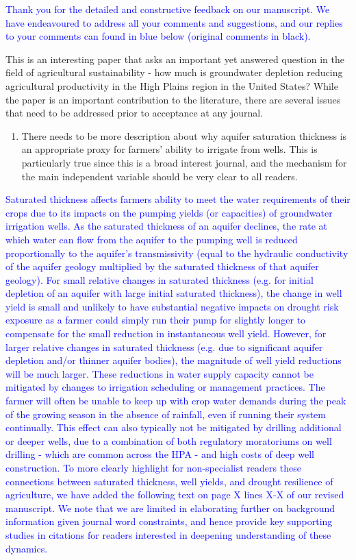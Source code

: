 \documentclass[
]{article}
\author{}
\date{\vspace{-2.5em}}
\providecommand{\tightlist}{%
  \setlength{\itemsep}{0pt}\setlength{\parskip}{0pt}}
\begin{document}
\textcolor{blue}{Thank you for the detailed and constructive feedback on our manuscript. We have endeavoured to address all your comments and suggestions, and our replies to your comments can found in blue below (original comments in black).}

This is an interesting paper that asks an important yet answered
question in the field of agricultural sustainability - how much is
groundwater depletion reducing agricultural productivity in the High
Plains region in the United States? While the paper is an important
contribution to the literature, there are several issues that need to be
addressed prior to acceptance at any journal.

\begin{enumerate}
\def\labelenumi{\arabic{enumi}.}
\tightlist
\item
  There needs to be more description about why aquifer saturation
  thickness is an appropriate proxy for farmers' ability to irrigate
  from wells. This is particularly true since this is a broad interest
  journal, and the mechanism for the main independent variable should be
  very clear to all readers.
\end{enumerate}

\textcolor{blue}{Saturated thickness affects farmers ability to meet the water requirements of their crops due to its impacts on the pumping yields (or capacities) of groundwater irrigation wells. As the saturated thickness of an aquifer declines, the rate at which water can flow from the aquifer to the pumping well is reduced proportionally to the aquifer's transmissivity (equal to the hydraulic conductivity of the aquifer geology multiplied by the saturated thickness of that aquifer geology). For small relative changes in saturated thickness (e.g. for initial depletion of an aquifer with large initial saturated thickness), the change in well yield is small and unlikely to have substantial negative impacts on drought risk exposure as a farmer could simply run their pump for slightly longer to compensate for the small reduction in instantaneous well yield. However, for larger relative changes in saturated thickness (e.g. due to significant aquifer depletion and/or thinner aquifer bodies), the magnitude of well yield reductions will be much larger. These reductions in water supply capacity cannot be mitigated by changes to irrigation scheduling or management practices. The farmer will often be unable to keep up with crop water demands during the peak of the growing season in the absence of rainfall, even if running their system continually. This effect can also typically not be mitigated by drilling additional or deeper wells, due to a combination of both regulatory moratoriums on well drilling - which are common across the HPA - and high costs of deep well construction. To more clearly highlight for non-specialist readers these connections between saturated thickness, well yields, and drought resilience of agriculture, we have added the following text on page X lines X-X of our revised manuscript. We note that we are limited in elaborating further on background information given journal word constraints, and hence provide key supporting studies in citations for readers interested in deepening understanding of these dynamics.}
\end{document}

